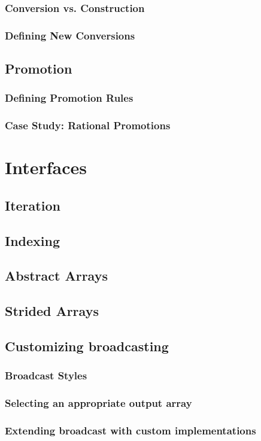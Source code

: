     \subsection{Conversion vs. Construction}
    \subsection{Defining New Conversions}
    \section{Promotion}
    \subsection{Defining Promotion Rules}
    \subsection{Case Study: Rational Promotions}
  \chapter{Interfaces}
    \section{Iteration}
    \section{Indexing}
    \section{Abstract Arrays}
    \section{Strided Arrays}
    \section{Customizing broadcasting}
    \subsection{Broadcast Styles}
    \subsection{Selecting an appropriate output array}
    \subsection{Extending broadcast with custom implementations}
